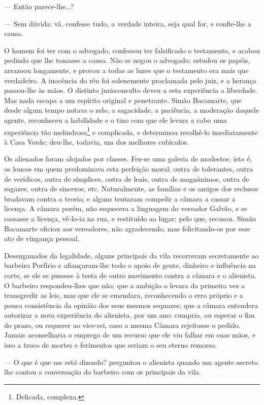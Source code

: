 --- Então parece-lhe\ldots{}?

--- Sem dúvida: vá, confesse tudo, a verdade inteira, seja qual for, e
confie-lhe a causa.

O homem foi ter com o advogado, confessou ter falsificado o testamento,
e acabou pedindo que lhe tomasse a causa. Não se negou o advogado;
estudou os papéis, arrazoou longamente, e provou a todas as luzes que o
testamento era mais que verdadeiro. A inocência do réu foi solenemente
proclamada pelo juiz, e a herança passou-lhe às mãos. O distinto
jurisconsulto deveu a esta experiência a liberdade. Mas nada escapa a um
espírito original e penetrante. Simão Bacamarte, que desde algum tempo
notava o zelo, a sagacidade, a paciência, a moderação daquele agente,
reconheceu a habilidade e o tino com que ele levara a cabo uma
experiência tão melindrosa\footnote{Delicada, complexa.} e complicada, e
determinou recolhê-lo imediatamente à Casa Verde; deu-lhe, todavia, um
dos melhores cubículos.

Os alienados foram alojados por classes. Fez-se uma galeria de modestos;
isto é, os loucos em quem predominava esta perfeição moral; outra de
tolerantes, outra de verídicos, outra de símplices, outra de leais,
outra de magnânimos, outra de sagazes, outra de sinceros, etc.
Naturalmente, as famílias e os amigos dos reclusos bradavam contra a
teoria; e alguns tentaram compelir a câmara a cassar a licença. A câmara
porém, não esquecera a linguagem do vereador Galvão, e se cassasse a
licença, vê-lo-ia na rua, e restituído ao lugar; pelo que, recusou.
Simão Bacamarte oficiou aos vereadores, não agradecendo, mas
felicitando-os por esse ato de vingança pessoal.

Desenganados da legalidade, alguns principais da vila recorreram
secretamente ao barbeiro Porfírio e afiançaram-lhe todo o apoio de
gente, dinheiro e influência na corte, se ele se pusesse à testa de
outro movimento contra a câmara e o alienista. O barbeiro respondeu-lhes
que não; que a ambição o levara da primeira vez a transgredir as leis,
mas que ele se emendara, reconhecendo o erro próprio e a pouca
consistência da opinião dos seus mesmos sequazes; que a câmara entendera
autorizar a nova experiência do alienista, por um ano: cumpria, ou
esperar o fim do prazo, ou requerer ao vice-rei, caso a mesma Câmara
rejeitasse o pedido. Jamais aconselharia o emprego de um recurso que ele
viu falhar em suas mãos, e isso a troco de mortes e ferimentos que
seriam o seu eterno remorso.

--- O que é que me está dizendo? perguntou o alienista quando um agente
secreto lhe contou a conversação do barbeiro com os principais da vila.

